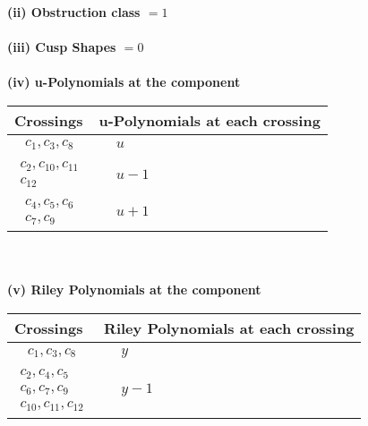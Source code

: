 \documentclass[1p]{elsarticle_modified}
\theoremstyle{definition}
\begin{document}
\flushleft \textbf{(ii) Obstruction class $= 1$}\\~\\
\flushleft \textbf{(iii) Cusp Shapes $= 0$}\\~\\
\newpage\renewcommand{\arraystretch}{1}
\flushleft \textbf{(iv) u-Polynomials at the component}\newline \\
\begin{tabular}{m{50pt}|m{274pt}}
Crossings & \hspace{64pt}u-Polynomials at each crossing \\
\hline $$\begin{aligned}c_{1},c_{3},c_{8}\end{aligned}$$&$\begin{aligned}
&u
\end{aligned}$\\
\hline $$\begin{aligned}c_{2},c_{10},c_{11}\\c_{12}\end{aligned}$$&$\begin{aligned}
&u-1
\end{aligned}$\\
\hline $$\begin{aligned}c_{4},c_{5},c_{6}\\c_{7},c_{9}\end{aligned}$$&$\begin{aligned}
&u+1
\end{aligned}$\\
\hline
\end{tabular}\\~\\
\newpage\renewcommand{\arraystretch}{1}
\flushleft \textbf{(v) Riley Polynomials at the component}\newline \\
\begin{tabular}{m{50pt}|m{274pt}}
Crossings & \hspace{64pt}Riley Polynomials at each crossing \\
\hline $$\begin{aligned}c_{1},c_{3},c_{8}\end{aligned}$$&$\begin{aligned}
&y
\end{aligned}$\\
\hline $$\begin{aligned}c_{2},c_{4},c_{5}\\c_{6},c_{7},c_{9}\\c_{10},c_{11},c_{12}\end{aligned}$$&$\begin{aligned}
&y-1
\end{aligned}$\\
\hline
\end{tabular}\\~\\
\end{document}
